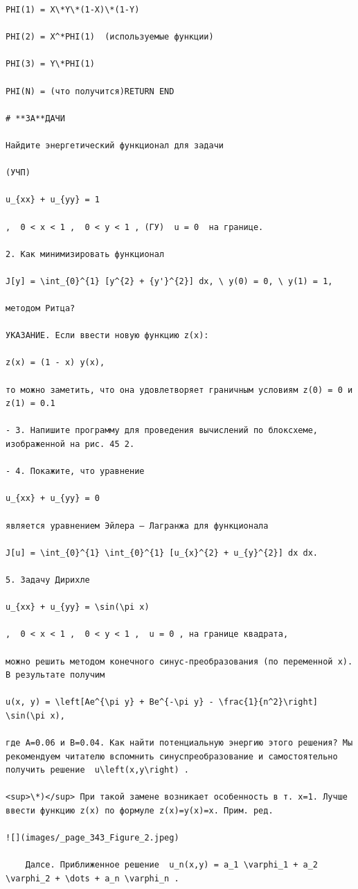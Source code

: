 \documentclass[
  ukrainian,
]{article}
\begin{document}
\begin{verbatim}
PHI(1) = X\*Y\*(1-X)\*(1-Y)

PHI(2) = X^*PHI(1)  (используемые функции)

PHI(3) = Y\*PHI(1)

PHI(N) = (что получится)RETURN END

# **ЗА**ДАЧИ

Найдите энергетический функционал для задачи

(УЧП)

u_{xx} + u_{yy} = 1

,  0 < x < 1 ,  0 < y < 1 , (ГУ)  u = 0  на границе.

2. Как минимизировать функционал

J[y] = \int_{0}^{1} [y^{2} + {y'}^{2}] dx, \ y(0) = 0, \ y(1) = 1,

методом Ритца?

УКАЗАНИЕ. Если ввести новую функцию z(x):

z(x) = (1 - x) y(x),

то можно заметить, что она удовлетворяет граничным условиям z(0) = 0 и z(1) = 0.1

- 3. Напишите программу для проведения вычислений по блоксхеме, изображенной на рис. 45 2.

- 4. Покажите, что уравнение

u_{xx} + u_{yy} = 0

является уравнением Эйлера — Лагранжа для функционала

J[u] = \int_{0}^{1} \int_{0}^{1} [u_{x}^{2} + u_{y}^{2}] dx dx.

5. Задачу Дирихле

u_{xx} + u_{yy} = \sin(\pi x)

,  0 < x < 1 ,  0 < y < 1 ,  u = 0 , на границе квадрата,

можно решить методом конечного синус-преобразования (по переменной х). В результате получим

u(x, y) = \left[Ae^{\pi y} + Be^{-\pi y} - \frac{1}{n^2}\right] \sin(\pi x),

где A=0.06 и B=0.04. Как найти потенциальную энергию этого решения? Мы рекомендуем читателю вспомнить синуспреобразование и самостоятельно получить решение  u\left(x,y\right) .

<sup>\*)</sup> При такой замене возникает особенность в т. x=1. Лучше ввести функцию z(x) по формуле z(x)=y(x)=x. Прим. ред.

![](images/_page_343_Figure_2.jpeg)

    Далсе. Приближенное решение  u_n(x,y) = a_1 \varphi_1 + a_2 \varphi_2 + \dots + a_n \varphi_n .


\end{verbatim}
\end{document}
